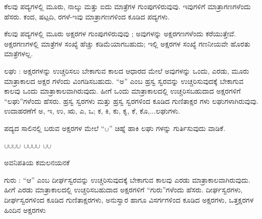 \begin{kbvrule}
\noindent\kbvbullet\hspace{0.5em}ಕೆಲವು ಪದ್ಯಗಳಲ್ಲಿ ಮೂರು, ನಾಲ್ಕು ಮತ್ತು ಐದು ಮಾತ್ರೆಗಳ ಗುಂಪುಗಳಿರುವುವು. ಇವುಗಳಿಗೆ ಮಾತ್ರಾಗಣಗಳೆಂದು ಹೆಸರು. ಕಂದ, ಷಟ್ಪದಿ, ರಗಳೆ-ಇವು ಮಾತ್ರಾಗಣಗಳಿಂದ ಕೂಡಿದ ಪದ್ಯಗಳು.\par
\noindent\kbvbullet\hspace{0.5em}ಕೆಲವು ಪದ್ಯಗಳಲ್ಲಿ ಮೂರು ಅಕ್ಷರಗಳ ಗುಂಪುಗಳಿರುವುವು ; ಅವುಗಳನ್ನು ಅಕ್ಷರಗಣಗಳೆಂದು ಕರೆಯುತ್ತೇವೆ. ಅಕ್ಷರಗಣಗಳಲ್ಲಿ ಮಾತ್ರೆಗಳ ಸಂಖ್ಯೆ ಹೆಚ್ಚು ಕಡಿಮೆಯಾಗಬಹುದು; ಇಲ್ಲಿ ಅಕ್ಷರಗಳ ಸಂಖ್ಯೆ ಗಣನೀಯವೇ ಹೊರತು ಮಾತ್ರೆಗಳಲ್ಲ.
\end{kbvrule}

\indent ಲಘು : ಅಕ್ಷರಗಳನ್ನು ಉಚ್ಚರಿಸಲು ಬೇಕಾಗುವ ಕಾಲದ ಆಧಾರದ ಮೇಲೆ ಅವುಗಳನ್ನು ಒಂದು, ಎರಡು, ಮೂರು ಮಾತ್ರಾಕಾಲದ ಅಕ್ಷರ ಗಳೆಂದು ವಿಂಗಡಿಸಬಹುದು. “ಅ” ಎಂಬ ಹ್ರಸ್ವ ಸ್ವರವನ್ನು ಉಚ್ಚರಿಸುವುದಕ್ಕೆ ಬೇಕಾಗುವ ಕಾಲವು ಒಂದು ಮಾತ್ರಾಕಾಲವಾಗಿರುವುದು. ಹೀಗೆ ಒಂದು ಮಾತ್ರಾಕಾಲದಲ್ಲಿ ಉಚ್ಚರಿಸಬಹುದಾದ ಅಕ್ಷರಗಳಿಗೆ “ಲಘು”ಗಳೆಂದು ಹೆಸರು. ಹ್ರಸ್ವ ಸ್ವರಗಳು ಮತ್ತು ಹ್ರಸ್ವ ಸ್ವರಗಳಿಂದ ಕೂಡಿದ ಗುಣಿತಾಕ್ಷರ ಗಳು ಲಘುಗಳಾಗಿರುವುವು. ಉದಾಹರಣೆಗೆ ಅ, ಇ, ಉ, ಋ, ಎ, ಒ; ಕ, ಕಿ, ಕು, ಕೃ, ಕೆ, ಕೊ,...ಲಘುಗಳು.\par

\indent ಪದ್ಯದ ಸಾಲಿನಲ್ಲಿ ಬರುವ ಅಕ್ಷರಗಳ ಮೇಲೆ “$\mbox{\laghu}$” ಚಿಹ್ನೆ ಹಾಕಿ ಲಘು ಗಳನ್ನು ಗುರ್ತಿಸುವುದು ವಾಡಿಕೆ.\par

\noindent\hspace*{1.2em}\hspace{0.6em}$\mbox{\laghu}\mbox{\laghu}\mbox{\laghu}\mbox{\laghu}$ $\mbox{\laghu}\mbox{\laghu}\mbox{\laghu}\mbox{\laghu}$ $\mbox{\laghu}\mbox{\laghu}$\par

\indent ಅವನಿಪತಿಯ ಕಮಲನಯನಕೆ\par

\indent ಗುರು : “ಆ” ಎಂಬ ದೀರ್ಘಸ್ವರವನ್ನು ಉಚ್ಚರಿಸುವುದಕ್ಕೆ ಬೇಕಾಗುವ ಕಾಲವು ಎರಡು ಮಾತ್ರಾಕಾಲವಾಗಿರುವುದು. ಹೀಗೆ ಎರಡು ಮಾತ್ರಾಕಾಲದಲ್ಲಿ ಉಚ್ಚರಿಸಬಹುದಾದ ಅಕ್ಷರಗಳಿಗೆ “ಗುರು”ಗಳೆಂದು ಹೆಸರು. ದೀರ್ಘಸ್ವರಗಳು, ದೀರ್ಘಸ್ವರಗಳಿಂದ ಕೂಡಿದ ಗುಣಿತಾಕ್ಷರಗಳು, ಅನುಸ್ವಾರ ಹಾಗೂ ವಿಸರ್ಗಗಳಿಂದ ಕೂಡಿದ ಅಕ್ಷರಗಳು, ಒತ್ತಕ್ಷರಗಳ ಹಿಂದಿನ ಅಕ್ಷರಗಳು\kbvcontinues
